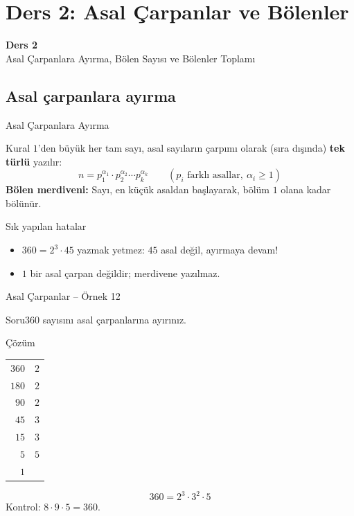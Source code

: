 \documentclass[aspectratio=169,11pt,handout]{beamer}
\newcommand{\soru}[3]{%
\begin{frame}{#1}
  \begin{block}{Soru}\large #2\end{block}
  \pause
  \begin{exampleblock}{Çözüm}\large #3\end{exampleblock}
\end{frame}}
\begin{document}
\section{Ders 2: Asal Çarpanlar ve Bölenler}
\begin{frame}
\centering\Large\color{anamavi}\textbf{Ders 2}\\[6pt]\normalsize Asal Çarpanlara Ayırma, Bölen Sayısı ve Bölenler Toplamı
\end{frame}

\subsection{Asal çarpanlara ayırma}
\begin{frame}{Asal Çarpanlara Ayırma}
\begin{block}{Kural}
\(1\)'den büyük her tam sayı, asal sayıların çarpımı olarak (sıra dışında) \textbf{tek türlü} yazılır:
\[n=p_1^{\alpha_1}\cdot p_2^{\alpha_2}\cdots p_k^{\alpha_k}\qquad(p_i \text{ farklı asallar},\ \alpha_i\ge 1)\]
\textbf{Bölen merdiveni:} Sayı, en küçük asaldan başlayarak, bölüm \(1\) olana kadar bölünür.
\end{block}
\begin{alertblock}{Sık yapılan hatalar}
\begin{itemize}
\item \(360=2^3\cdot 45\) yazmak yetmez: \(45\) asal değil, ayırmaya devam!
\item \(1\) bir asal çarpan değildir; merdivene yazılmaz.
\end{itemize}
\end{alertblock}
\end{frame}

\soru{Asal Çarpanlar -- Örnek 12}
{\(360\) sayısını asal çarpanlarına ayırınız.}
{\begin{minipage}[t]{0.3\linewidth}
\normalsize
\begin{tabular}{r|l}
\(360\) & \(2\)\\ \(180\) & \(2\)\\ \(90\) & \(2\)\\ \(45\) & \(3\)\\ \(15\) & \(3\)\\ \(5\) & \(5\)\\ \(1\) &
\end{tabular}
\end{minipage}\hfill
\begin{minipage}[t]{0.65\linewidth}
\vspace{20pt}
\[360=2^3\cdot 3^2\cdot 5\]
Kontrol: \(8\cdot 9\cdot 5=360\).
\end{minipage}}
\end{document}
